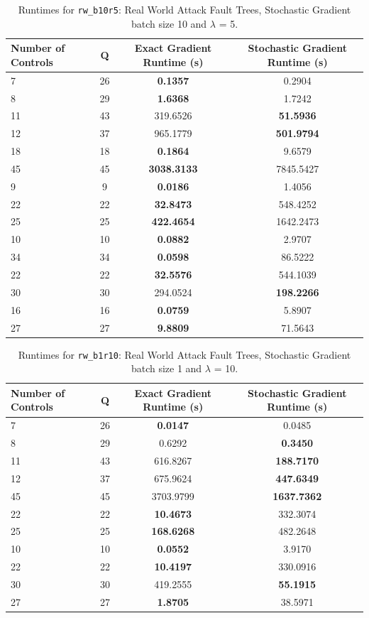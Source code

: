\documentclass{article}
\begin{document}
\begin{table}[h]
\centering
\begin{tabular}{lccc}
\toprule
Number of Controls & Q & Exact Gradient Runtime (s) & Stochastic Gradient Runtime (s) \\
\midrule
7 & 26 & \textbf{0.1357} & 0.2904 \\
8 & 29 & \textbf{1.6368} & 1.7242 \\
11 & 43 & 319.6526 & \textbf{51.5936} \\
12 & 37 & 965.1779 & \textbf{501.9794} \\
18 & 18 & \textbf{0.1864} & 9.6579 \\
45 & 45 & \textbf{3038.3133} & 7845.5427 \\
9 & 9 & \textbf{0.0186} & 1.4056 \\
22 & 22 & \textbf{32.8473} & 548.4252 \\
25 & 25 & \textbf{422.4654} & 1642.2473 \\
10 & 10 & \textbf{0.0882} & 2.9707 \\
34 & 34 & \textbf{0.0598} & 86.5222 \\
22 & 22 & \textbf{32.5576} & 544.1039 \\
30 & 30 & 294.0524 & \textbf{198.2266} \\
16 & 16 & \textbf{0.0759} & 5.8907 \\
27 & 27 & \textbf{9.8809} & 71.5643 \\
\bottomrule
\end{tabular}
\caption{Runtimes for \texttt{rw\_b10r5}: Real World Attack Fault Trees, Stochastic Gradient batch size 10 and $\lambda$ = 5.}
\end{table}

\begin{table}[h]
\centering
\begin{tabular}{lccc}
\toprule
Number of Controls & Q & Exact Gradient Runtime (s) & Stochastic Gradient Runtime (s) \\
\midrule
7 & 26 & \textbf{0.0147} & 0.0485 \\
8 & 29 & 0.6292 & \textbf{0.3450} \\
11 & 43 & 616.8267 & \textbf{188.7170} \\
12 & 37 & 675.9624 & \textbf{447.6349} \\
45 & 45 & 3703.9799 & \textbf{1637.7362} \\
22 & 22 & \textbf{10.4673} & 332.3074 \\
25 & 25 & \textbf{168.6268} & 482.2648 \\
10 & 10 & \textbf{0.0552} & 3.9170 \\
22 & 22 & \textbf{10.4197} & 330.0916 \\
30 & 30 & 419.2555 & \textbf{55.1915} \\
27 & 27 & \textbf{1.8705} & 38.5971 \\
\bottomrule
\end{tabular}
\caption{Runtimes for \texttt{rw\_b1r10}: Real World Attack Fault Trees, Stochastic Gradient batch size 1 and $\lambda$ = 10.}
\end{table}
\end{document}
